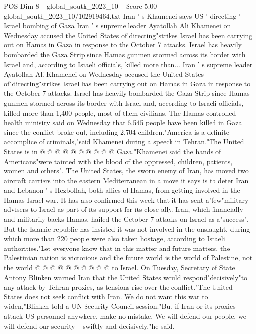 \begin{textsample}{POS Dim 8 – global\_south\_2023\_10 – Score 5.00 – global\_south\_2023\_10/102919464.txt}  \label{ex:f8_pos_367}
Iran ' s Khamenei says US ' directing ' Israel bombing of Gaza Iran ' s supreme leader Ayatollah Ali Khamenei on Wednesday accused the United States of"directing"strikes Israel has been carrying out on Hamas in Gaza in response to the October 7 attacks.
Israel has heavily bombarded the Gaza Strip since Hamas gunmen stormed across its border with Israel and, according to Israeli officials, killed more than...
Iran ' s supreme leader Ayatollah Ali Khamenei on Wednesday accused the United States of"directing"strikes Israel has been carrying out on Hamas in Gaza in response to the October 7 attacks.
Israel has heavily bombarded the Gaza Strip since Hamas gunmen stormed across its border with Israel and, according to Israeli officials, killed more than 1,400 people, most of them civilians.
The Hamas-controlled health ministry said on Wednesday that 6,545 people have been killed in Gaza since the conflict broke out, including 2,704 children."America is a definite accomplice of criminals,"said Khamenei during a speech in Tehran."The United States is in @ @ @ @ @ @ @ @ @ @ Gaza."Khamenei said the hands of Americans"were tainted with the blood of the oppressed, children, patients, women and others".
The United States, the sworn enemy of Iran, has moved two aircraft carriers into the eastern Mediterranean in a move it says is to deter Iran and Lebanon ' s Hezbollah, both allies of Hamas, from getting involved in the Hamas-Israel war.
It has also confirmed this week that it has sent a"few"military advisers to Israel as part of its support for its close ally.
Iran, which financially and militarily backs Hamas, hailed the October 7 attacks on Israel as a"success".
But the Islamic republic has insisted it was not involved in the onslaught, during which more than 220 people were also taken hostage, according to Israeli authorities."Let everyone know that in this matter and future matters, the Palestinian nation is victorious and the future world is the world of Palestine, not the world @ @ @ @ @ @ @ @ @ @ to Israel.
On Tuesday, Secretary of State Antony Blinken warned Iran that the United States would respond"decisively"to any attack by Tehran proxies, as tensions rise over the conflict."The United States does not seek conflict with Iran.
We do not want this war to widen,"Blinken told a UN Security Council session."But if Iran or its proxies attack US personnel anywhere, make no mistake.
We will defend our people, we will defend our security -- swiftly and decisively,"he said.

\end{textsample}
